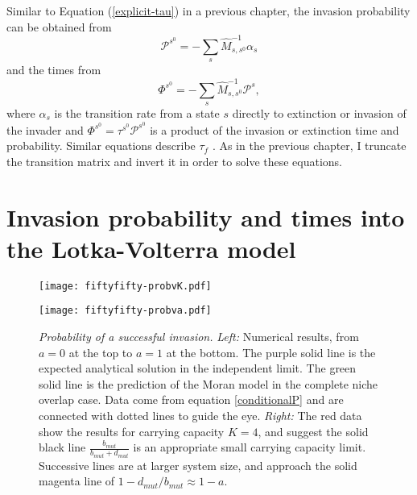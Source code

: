 Similar to Equation (\ref{explicit-tau}) in a previous chapter, the invasion probability can be obtained from \cite{Nisbet1982,Iyer-Biswas2015}
\begin{equation}
\mathcal{P}^{s^0} = -\sum_s \hat{M}^{-1}_{s,s^0}\alpha_{s} %
\end{equation} \label{conditionalP}
and the times from
\begin{equation}
\Phi^{s^0} = -\sum_s \hat{M}^{-1}_{s,s^0}\mathcal{P}^{s}, %
\end{equation} \label{conditionalPhi}
where $\alpha_s$ is the transition rate from a state $s$ directly to extinction or invasion of the invader and $\Phi^{s^0}=\tau^{s^0}\mathcal{P}^{s^0}$ is a product of the invasion or extinction time and probability. 
Similar equations describe $\tau_f$ \cite{Nisbet1982,Iyer-Biswas2015}.
As in the previous chapter, I truncate the transition matrix and invert it in order to solve these equations. 


\section{Invasion probability and times into the Lotka-Volterra model}
\begin{figure}[h]
	\centering
	\begin{minipage}{0.49\linewidth}
		\centering
		\texttt{[image: fiftyfifty-probvK.pdf]}
	\end{minipage}
	\begin{minipage}{0.49\linewidth}
		\centering
		\texttt{[image: fiftyfifty-probva.pdf]}
	\end{minipage}
	\caption{\emph{Probability of a successful invasion.}
		\emph{Left:} Numerical results, from $a=0$ at the top to $a=1$ at the bottom. The purple solid line is the expected analytical solution in the independent limit. The green solid line is the prediction of the Moran model in the complete niche overlap case. Data come from equation \ref{conditionalP} and are connected with dotted lines to guide the eye. 
		\emph{Right:} The red data show the results for carrying capacity $K=4$, and suggest the solid black line $\frac{b_{mut}}{b_{mut}+d_{mut}}$ is an appropriate small carrying capacity limit. Successive lines are at larger system size, and approach the solid magenta line of $1-d_{mut}/b_{mut}\approx 1-a$.
	} \label{Esucc}
\end{figure}


